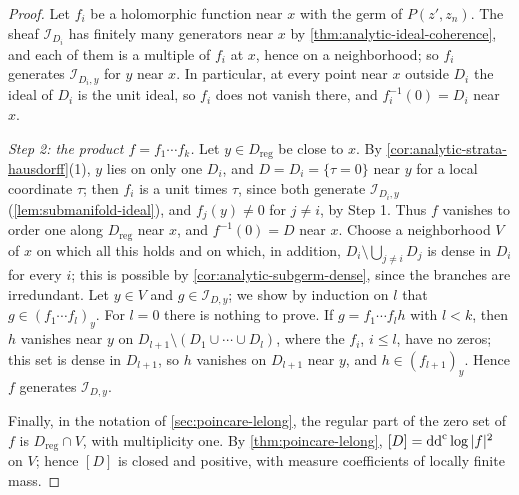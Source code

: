 \begin{proof}
Let $f_i$ be a holomorphic function near $x$ with the germ of $P(z',z_n)$. The sheaf $\mathcal I_{D_i}$ has finitely many generators near $x$ by \cref{thm:analytic-ideal-coherence}, and each of them is a multiple of $f_i$ at $x$, hence on a neighborhood; so $f_i$ generates $\mathcal I_{D_i,y}$ for $y$ near $x$. In particular, at every point near $x$ outside $D_i$ the ideal of $D_i$ is the unit ideal, so $f_i$ does not vanish there, and $f_i^{-1}(0)=D_i$ near $x$.

\emph{Step 2: the product $f=f_1\cdots f_k$.} Let $y\in D_{\mathrm{reg}}$ be close to $x$. By \cref{cor:analytic-strata-hausdorff}(1), $y$ lies on only one $D_i$, and $D=D_i=\{\tau=0\}$ near $y$ for a local coordinate $\tau$; then $f_i$ is a unit times $\tau$, since both generate $\mathcal I_{D_i,y}$ (\cref{lem:submanifold-ideal}), and $f_j(y)\neq0$ for $j\neq i$, by Step 1. Thus $f$ vanishes to order one along $D_{\mathrm{reg}}$ near $x$, and $f^{-1}(0)=D$ near $x$. Choose a neighborhood $V$ of $x$ on which all this holds and on which, in addition, $D_i\setminus\bigcup_{j\neq i}D_j$ is dense in $D_i$ for every $i$; this is possible by \cref{cor:analytic-subgerm-dense}, since the branches are irredundant. Let $y\in V$ and $g\in\mathcal I_{D,y}$; we show by induction on $l$ that $g\in(f_1\cdots f_l)_y$. For $l=0$ there is nothing to prove. If $g=f_1\cdots f_lh$ with $l<k$, then $h$ vanishes near $y$ on $D_{l+1}\setminus(D_1\cup\cdots\cup D_l)$, where the $f_i$, $i\leq l$, have no zeros; this set is dense in $D_{l+1}$, so $h$ vanishes on $D_{l+1}$ near $y$, and $h\in(f_{l+1})_y$. Hence $f$ generates $\mathcal I_{D,y}$.

Finally, in the notation of \cref{sec:poincare-lelong}, the regular part of the zero set of $f$ is $D_{\mathrm{reg}}\cap V$, with multiplicity one. By \cref{thm:poincare-lelong}, $[D]=\mathrm{dd}^{\mathrm{c}}\log|f|^2$ on $V$; hence $[D]$ is closed and positive, with measure coefficients of locally finite mass.
\end{proof}

